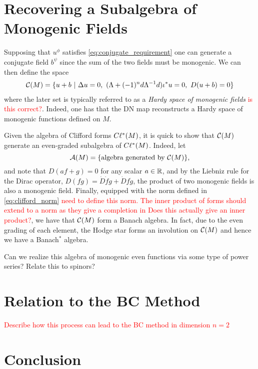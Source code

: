 \documentclass[12pt]{article}
\begin{document}
\section{Recovering a Subalgebra of Monogenic Fields}

Supposing that $u^\phi$ satisfies \ref{eq:conjugate_requirement} one can generate a conjugate field $b^\psi$ since the sum of the two fields must be monogenic.  We can then define the space
\begin{align*}
\mathcal{C}(M) &= \{ u + b ~ \vert ~ \Delta u = 0, ~ (\Lambda +(-1)^n d\Lambda^{-1}d)\iota^* u =0, ~D(u+b)=0\}\\
\end{align*}
where the later set is typically referred to as a \emph{Hardy space of monogenic fields} \textcolor{red}{is this correct?}. Indeed, one has that the DN map reconstructs a Hardy space of monogenic functions defined on $M$.

Given the algebra of Clifford forms $C\ell^*(M)$, it is quick to show that $\mathcal{C}(M)$ generate an even-graded subalgebra of $C\ell^*(M)$. Indeed, let 
\[
\mathcal{A}(M) = \{\textrm{algebra generated by $\mathcal{C}(M)$}\},
\]
and note that $D(af+g)=0$ for any scalar $a\in \mathbb{R}$, and by the Liebniz rule for the Dirac operator, $D(fg)=\dot{D}\dot{f}g+\dot{D}f\dot{g}$, the product of two monogenic fields is also a monogenic field.  Finally, equipped with the norm defined in \ref{eq:clifford_norm} \textcolor{red}{need to define this norm. The inner product of forms should extend to a norm as they give a completion in \cite{belishev_dirichlet_2008} Does this actually give an inner product?}, we have that $\mathcal{C}(M)$ form a Banach algebra. In fact, due to the even grading of each element, the Hodge star forms an involution on $\mathcal{C}(M)$ and hence we have a Banach$^*$ algebra.

\begin{question}
Can we realize this algebra of monogenic even functions via some type of power series? Relate this to spinors?
\end{question}


\section{Relation to the BC Method}

\textcolor{red}{Describe how this process can lead to the BC method in dimension $n=2$}


\section{Conclusion}





\end{document}
